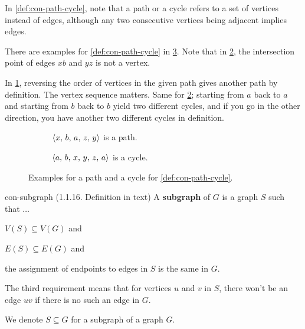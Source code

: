 \documentclass[../src/handouts/main.tex]{subfiles}
\begin{document}
In \cref{def:con-path-cycle}, note that a path or a cycle refers to a set of vertices instead of edges, although any two consecutive vertices being adjacent implies edges.

There are examples for \cref{def:con-path-cycle} in \cref{fig:con-path-cycle}. Note that in \cref{fig:con-cycle}, the intersection point of edges $xb$ and $yz$ is not a vertex.

In \cref{fig:con-path}, reversing the order of vertices in the given path gives another path by definition. The vertex sequence matters. Same for \cref{fig:con-cycle}; starting from $a$ back to $a$ and starting from $b$ back to $b$ yield two different cycles, and if you go in the other direction, you have another two different cycles in definition.

\begin{figure}[htbp]
  \def \nodelist {
    \node[main] (x) at (0, 1.5) {$x$}
    node[main] (y) at (0, 0) {$y$}
    node[main] (z) at (1.5, 1.5) {$z$}
    node[main] (b) at (1.5, 0) {$b$}
    node[main] (a) at (3, 0.75) {$a$};}

  \centering
  \begin{subfigure}{.3\textwidth}
    \centering
    \caption{$\langle x,\, b,\, a,\, z,\, y\rangle$ is a path.}
    \label{fig:con-path}
  \end{subfigure}
  \begin{subfigure}{.3\textwidth}
    \centering
    \caption{$\langle a,\, b,\, x,\, y,\, z,\, a\rangle$ is a cycle.}
    \label{fig:con-cycle}
  \end{subfigure}

  \caption{Examples for a path and a cycle for \cref{def:con-path-cycle}.}
  \label{fig:con-path-cycle}
\end{figure}

\begin{definition}{}{con-subgraph}
  (1.1.16. Definition in text)
  A \textbf{subgraph} of $G$ is a graph $S$ such that $\ldots$
  \begin{enumerate*}
    \item $V(S) \subseteq V(G)$ and
    \item $E(S) \subseteq E(G)$ and
    \item the assignment of endpoints to edges in $S$ is the same in $G$.
  \end{enumerate*}

  The third requirement means that for vertices $u$ and $v$ in $S$, there won't be an edge $uv$ if there is no such an edge in $G$.

  We denote $S \subseteq G$ for a subgraph of a graph $G$.
\end{definition}
\end{document}
